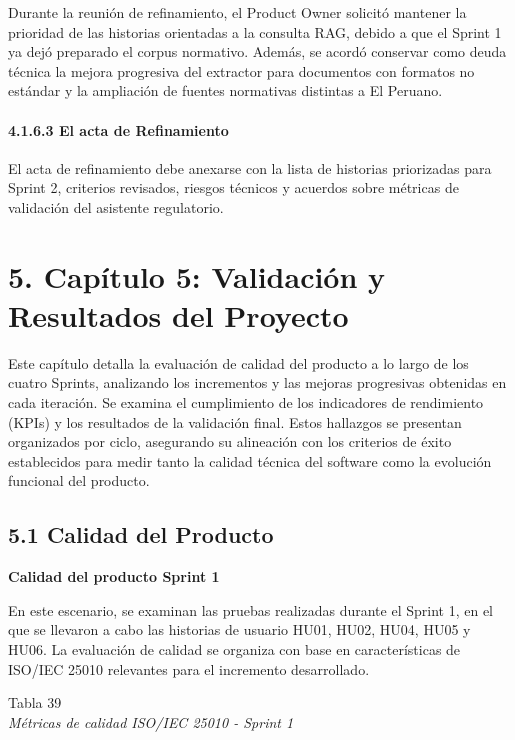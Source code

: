 \documentclass[12pt,a4paper,oneside]{report}
\begin{document}
Durante la reunión de refinamiento, el Product Owner solicitó mantener
la prioridad de las historias orientadas a la consulta RAG, debido a que
el Sprint 1 ya dejó preparado el corpus normativo. Además, se acordó
conservar como deuda técnica la mejora progresiva del extractor para
documentos con formatos no estándar y la ampliación de fuentes
normativas distintas a El Peruano.

\paragraph{4.1.6.3 El acta de
Refinamiento}\label{el-acta-de-refinamiento}

El acta de refinamiento debe anexarse con la lista de historias
priorizadas para Sprint 2, criterios revisados, riesgos técnicos y
acuerdos sobre métricas de validación del asistente regulatorio.

\section{5. Capítulo 5: Validación y Resultados del
Proyecto}\label{capuxedtulo-5-validaciuxf3n-y-resultados-del-proyecto}

Este capítulo detalla la evaluación de calidad del producto a lo largo
de los cuatro Sprints, analizando los incrementos y las mejoras
progresivas obtenidas en cada iteración. Se examina el cumplimiento de
los indicadores de rendimiento (KPIs) y los resultados de la validación
final. Estos hallazgos se presentan organizados por ciclo, asegurando su
alineación con los criterios de éxito establecidos para medir tanto la
calidad técnica del software como la evolución funcional del producto.

\subsection{5.1 Calidad del Producto}\label{calidad-del-producto}

\textbf{Calidad del producto Sprint 1}

En este escenario, se examinan las pruebas realizadas durante el Sprint
1, en el que se llevaron a cabo las historias de usuario HU01, HU02,
HU04, HU05 y HU06. La evaluación de calidad se organiza con base en
características de ISO/IEC 25010 relevantes para el incremento
desarrollado.

\label{_Toc231672294}{}Tabla 39\\
\emph{Métricas de calidad ISO/IEC 25010 - Sprint 1}
\end{document}
